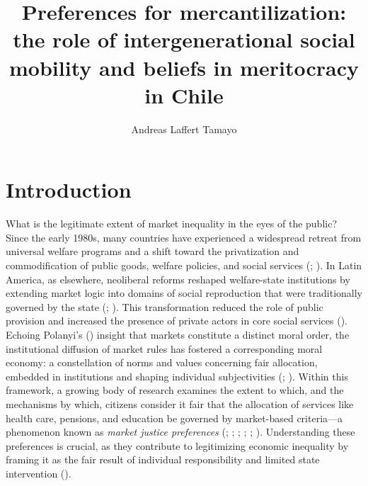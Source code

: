 \documentclass[
  12pt,
]{article}
\title{Preferences for mercantilization: the role of intergenerational
social mobility and beliefs in meritocracy in Chile}
\author{Andreas Laffert Tamayo}
\affil{%
                  Instituto de Sociología, Pontificia Universidad
                  Católica de Chile
              }
\date{}
\begin{document}
\maketitle

\section{Introduction}\label{introduction}

What is the legitimate extent of market inequality in the eyes of the
public? Since the early 1980s, many countries have experienced a
widespread retreat from universal welfare programs and a shift toward
the privatization and commodification of public goods, welfare policies,
and social services (; ). In Latin
America, as elsewhere, neoliberal reforms reshaped welfare-state
institutions by extending market logic into domains of social
reproduction that were traditionally governed by the state
(;
). This transformation
reduced the role of public provision and increased the presence of
private actors in core social services
(). Echoing Polanyi's
() insight that markets
constitute a distinct moral order, the institutional diffusion of market
rules has fostered a corresponding moral economy: a constellation of
norms and values concerning fair allocation, embedded in institutions
and shaping individual subjectivities
(;
). Within
this framework, a growing body of research examines the extent to which,
and the mechanisms by which, citizens consider it fair that the
allocation of services like health care, pensions, and education be
governed by market-based criteria---a phenomenon known as \emph{market
justice preferences} (; ; ;
;
;
).
Understanding these preferences is crucial, as they contribute to
legitimizing economic inequality by framing it as the fair result of
individual responsibility and limited state intervention
().
\end{document}
